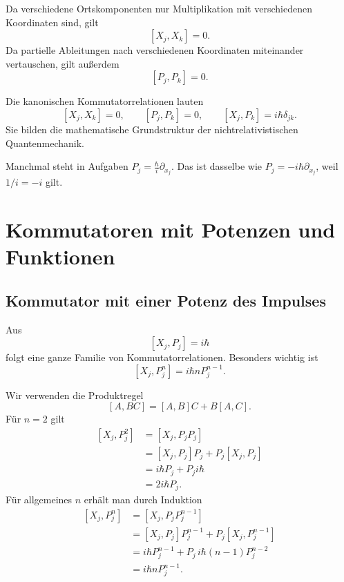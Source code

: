 Da verschiedene Ortskomponenten nur Multiplikation mit verschiedenen Koordinaten sind, gilt
\[
    [X_j,X_k]=0.
\]
Da partielle Ableitungen nach verschiedenen Koordinaten miteinander vertauschen, gilt außerdem
\[
    [P_j,P_k]=0.
\]

\begin{formulabox}
Die kanonischen Kommutatorrelationen lauten
\[
    [X_j,X_k]=0,
    \qquad
    [P_j,P_k]=0,
    \qquad
    [X_j,P_k]=i\hbar\delta_{jk}.
\]
Sie bilden die mathematische Grundstruktur der nichtrelativistischen Quantenmechanik.
\end{formulabox}

\begin{notebox}
Manchmal steht in Aufgaben $P_j=\frac{\hbar}{i}\partial_{x_j}$. Das ist dasselbe wie $P_j=-i\hbar\partial_{x_j}$, weil $1/i=-i$ gilt.
\end{notebox}

\section{Kommutatoren mit Potenzen und Funktionen}

\subsection{Kommutator mit einer Potenz des Impulses}

Aus
\[
    [X_j,P_j]=i\hbar
\]
folgt eine ganze Familie von Kommutatorrelationen. Besonders wichtig ist
\[
    [X_j,P_j^n]=i\hbar nP_j^{n-1}.
\]

\begin{derivationbox}
Wir verwenden die Produktregel
\[
    [A,BC]=[A,B]C+B[A,C].
\]
Für $n=2$ gilt
\[
\begin{aligned}
    [X_j,P_j^2]
    &=[X_j,P_jP_j] \\
    &=[X_j,P_j]P_j+P_j[X_j,P_j] \\
    &=i\hbar P_j+P_j i\hbar \\
    &=2i\hbar P_j.
\end{aligned}
\]
Für allgemeines $n$ erhält man durch Induktion
\[
\begin{aligned}
    [X_j,P_j^n]
    &=[X_j,P_jP_j^{n-1}] \\
    &=[X_j,P_j]P_j^{n-1}+P_j[X_j,P_j^{n-1}] \\
    &=i\hbar P_j^{n-1}+P_j\,i\hbar(n-1)P_j^{n-2} \\
    &=i\hbar nP_j^{n-1}.
\end{aligned}
\]
\end{derivationbox}

